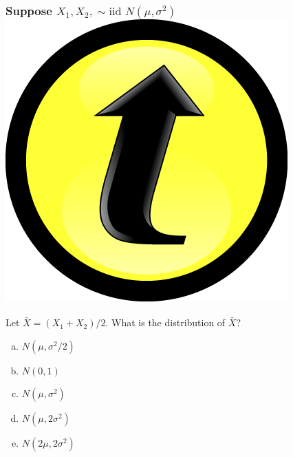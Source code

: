 \documentclass[handout]{beamer}
\begin{document}
\begin{frame}
\frametitle{Suppose $X_1, X_2, \sim \mbox{iid } N(\mu, \sigma^2)$ \hfill \includegraphics[scale = 0.05]{./images/clicker}}

Let $\bar{X} = (X_1 + X_2)/2$. What is the distribution of $\bar{X}$?
\begin{enumerate}[(a)]
\item $N(\mu, \sigma^2/2)$
\item $N(0,1)$
\item $N(\mu, \sigma^2)$
\item $N(\mu, 2\sigma^2)$
\item $N(2\mu, 2\sigma^2)$
\end{enumerate}

\end{frame}
\end{document}
